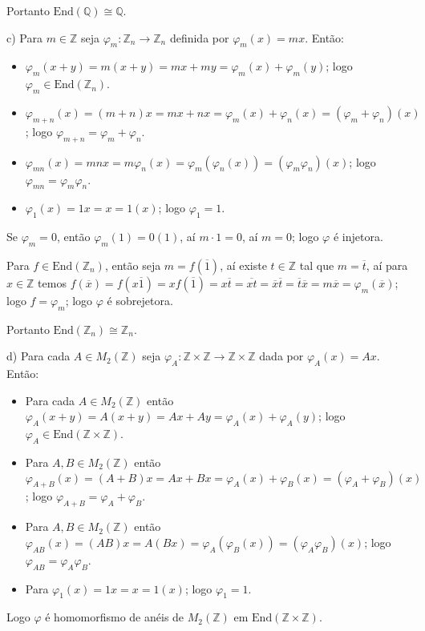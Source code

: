 \documentclass[10pt,a4paper]{article}
\begin{document}
\medskip
\noindent
Portanto $\mathrm{End}(\mathbb{Q})\cong\mathbb{Q}$.

\medskip
\noindent
c) Para $m\in\mathbb{Z}$ seja $\varphi_m:\mathbb{Z}_n\rightarrow\mathbb{Z}_n$ definida por $\varphi_m(x)=mx$. Então:
\begin{itemize}
\item $\varphi_m(x+y)=m(x+y)=mx+my=\varphi_m(x)+\varphi_m(y)$; logo $\varphi_m\in\mathrm{End}(\mathbb{Z}_n)$.
\item $\varphi_{m+n}(x)=(m+n)x=mx+nx=\varphi_m(x)+\varphi_n(x)=(\varphi_m+\varphi_n)(x)$; logo $\varphi_{m+n}=\varphi_m+\varphi_n$.
\item $\varphi_{mn}(x)=mnx=m\varphi_n(x)=\varphi_m(\varphi_n(x))=(\varphi_m\varphi_n)(x)$; logo $\varphi_{mn}=\varphi_m\varphi_n$.
\item $\varphi_1(x)=1x=x=1(x)$; logo $\varphi_1=1$.
\end{itemize}

\medskip
\noindent
Se $\varphi_m=0$, então $\varphi_m(1)=0(1)$, aí $m\cdot1=0$, aí $m=0$; logo $\varphi$ é injetora.

\medskip
\noindent
Para $f\in\mathrm{End}(\mathbb{Z}_n)$, então seja $m=f(\overline{1})$, aí existe $t\in\mathbb{Z}$ tal que $m=\overline{t}$, aí para $x\in\mathbb{Z}$ temos $f(\overline{x})=f(x\overline{1})=xf(\overline{1})=x\overline{t}=\overline{xt}=\overline{x}\overline{t}=\overline{t}\overline{x}=m\overline{x}=\varphi_m(\overline{x})$; logo $f=\varphi_m$; logo $\varphi$ é sobrejetora.

\medskip
\noindent
Portanto $\mathrm{End}(\mathbb{Z}_n)\cong\mathbb{Z}_n$.

\medskip
\noindent
d) Para cada $A\in M_2(\mathbb{Z})$ seja $\varphi_A:\mathbb{Z}\times\mathbb{Z}\rightarrow\mathbb{Z}\times\mathbb{Z}$ dada por $\varphi_A(x)=Ax$. Então:
\begin{itemize}
\item Para cada $A\in M_2(\mathbb{Z})$ então $\varphi_A(x+y)=A(x+y)=Ax+Ay=\varphi_A(x)+\varphi_A(y)$; logo $\varphi_A\in\mathrm{End}(\mathbb{Z}\times\mathbb{Z})$.
\item Para $A,B\in M_2(\mathbb{Z})$ então $\varphi_{A+B}(x)=(A+B)x=Ax+Bx=\varphi_A(x)+\varphi_B(x)=(\varphi_A+\varphi_B)(x)$; logo $\varphi_{A+B}=\varphi_A+\varphi_B$.
\item Para $A,B\in M_2(\mathbb{Z})$ então $\varphi_{AB}(x)=(AB)x=A(Bx)=\varphi_A(\varphi_B(x))=(\varphi_A\varphi_B)(x)$; logo $\varphi_{AB}=\varphi_A\varphi_B$.
\item Para $\varphi_1(x)=1x=x=1(x)$; logo $\varphi_1=1$.
\end{itemize}
Logo $\varphi$ é homomorfismo de anéis de $M_2(\mathbb{Z})$ em $\mathrm{End}(\mathbb{Z}\times\mathbb{Z})$.
\end{document}
